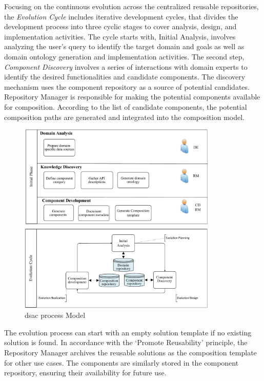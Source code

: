 Focusing on the continuous evolution across the centralized reusable
repositories, the \emph{Evolution Cycle} includes iterative development
cycles, that divides the development process into three cyclic stages to
cover analysis, design, and implementation activities. The cycle starts
with, Initial Analysis, involves analyzing the user's query to identify
the target domain and goals as well as domain ontology generation and
implementation activities. The second step, \emph{Component Discovery}
involves a series of interactions with domain experts to identify the
desired functionalities and candidate components. The discovery
mechanism uses the component repository as a source of potential
candidates. Repository Manager is responsible for making the potential
components available for composition. According to the list of candidate
components, the potential composition paths are generated and integrated
into the composition model.

\begin{figure}[hbt]
\hypertarget{fig:process-model}{%
\centering
\includegraphics[width=0.85\textwidth]{../figures/MyFigures/PM.drawio.pdf}
\captionsetup{justification=centering}
\caption{\gls{dsac} process Model}\label{fig:process-model}
}
\end{figure}
The evolution process can start with an empty solution template if no existing solution is found. In accordance with the ‘Promote Reusability’ principle, the Repository Manager archives the reusable solutions as the composition template for other use cases. The components are similarly stored in the component repository, ensuring their availability for future use.

